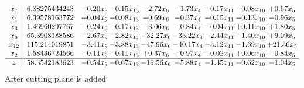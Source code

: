 \documentclass[8pt]{article}
\begin{document}
\[\begin{array}{c| c c@{\hskip 2pt} c@{\hskip 2pt} c@{\hskip 2pt} c@{\hskip 2pt} c@{\hskip 2pt} c@{\hskip 2pt} c@{\hskip 2pt} }
 x_{7}   &  6.88275434243 & -0.20 x_{9} & -0.15 x_{13} & -2.72 x_{6} & -1.73 x_{4} & -0.17 x_{11} & -0.08 x_{10} & +  0.67 x_{5}\\
 x_{1}   &  6.39578163772 & +  0.04 x_{9} & -0.08 x_{13} & -0.69 x_{6} & -0.37 x_{4} & -0.15 x_{11} & -0.13 x_{10} & -0.96 x_{5}\\
 x_{3}   &  1.46960297767 & -0.24 x_{9} & -0.17 x_{13} & -3.06 x_{6} & -0.84 x_{4} & -0.04 x_{11} & +  0.11 x_{10} & +  1.80 x_{5}\\
 x_{8}   &  65.3908188586 & -2.67 x_{9} & -2.82 x_{13} & -32.27 x_{6} & -33.22 x_{4} & -2.44 x_{11} & -1.40 x_{10} & +  9.09 x_{5}\\
 x_{12}   &  115.214019851 & -3.41 x_{9} & -3.88 x_{13} & -47.96 x_{6} & -40.17 x_{4} & -3.12 x_{11} & -1.69 x_{10} & + 21.36 x_{5}\\
 x_{2}   &  1.58436724566 & +  0.11 x_{9} & +  0.11 x_{13} & +  0.37 x_{6} & +  0.97 x_{4} & -0.02 x_{11} & +  0.06 x_{10} & -0.84 x_{5}\\
\hline
z    &  58.3542183623 & -0.54 x_{9} & -0.67 x_{13} & -19.56 x_{6} & -5.88 x_{4} & -1.35 x_{11} & -0.62 x_{10} & -1.04 x_{5}\\
\end{array}\]
 After cutting plane is added 
\end{document}

